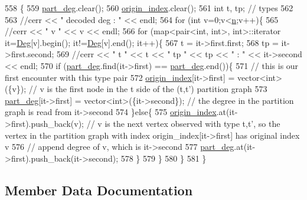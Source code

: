 \begin{DoxyCode}
558 \{
559   \hyperlink{classmarked__graph__decoder_a6882e96fcad9abb10e72f1398814824a}{part\_deg}.clear();
560   \hyperlink{classmarked__graph__decoder_aab3e2f6d4376ba96da32f25aa9ddd069}{origin\_index}.clear();
561   \textcolor{keywordtype}{int} t, tp; \textcolor{comment}{// types}
562 
563   \textcolor{comment}{//cerr << " decoded deg : " << endl;}
564   \textcolor{keywordflow}{for} (\textcolor{keywordtype}{int} v=0;v<\hyperlink{classmarked__graph__decoder_aefc93611bc4a3e9a5d3956d97649a0e9}{n};v++)\{
565     \textcolor{comment}{//cerr << " v " << v << endl;}
566     \textcolor{keywordflow}{for} (map<pair<int, int>, \textcolor{keywordtype}{int}>::iterator it=\hyperlink{classmarked__graph__decoder_a5040ad86467693eab415f615408bfb9e}{Deg}[v].begin(); it!=\hyperlink{classmarked__graph__decoder_a5040ad86467693eab415f615408bfb9e}{Deg}[v].end(); it++)\{
567       t = it->first.first;
568       tp = it->first.second;
569       \textcolor{comment}{//cerr << " t " << t << " tp " << tp << " : " << it->second << endl;}
570       \textcolor{keywordflow}{if} (\hyperlink{classmarked__graph__decoder_a6882e96fcad9abb10e72f1398814824a}{part\_deg}.find(it->first) == \hyperlink{classmarked__graph__decoder_a6882e96fcad9abb10e72f1398814824a}{part\_deg}.end())\{
571         \textcolor{comment}{// this is our first encounter with this type pair}
572         \hyperlink{classmarked__graph__decoder_aab3e2f6d4376ba96da32f25aa9ddd069}{origin\_index}[it->first] = vector<int>(\{v\}); \textcolor{comment}{// v is the first node in the t side of the
       (t,t') partition graph}
573         \hyperlink{classmarked__graph__decoder_a6882e96fcad9abb10e72f1398814824a}{part\_deg}[it->first] = vector<int>(\{it->second\}); \textcolor{comment}{// the degree in the partition graph is
       read from it->second}
574       \}\textcolor{keywordflow}{else}\{
575         \hyperlink{classmarked__graph__decoder_aab3e2f6d4376ba96da32f25aa9ddd069}{origin\_index}.at(it->first).push\_back(v); \textcolor{comment}{// v is the next vertex observed with type
       t,t', so the vertex in the partition graph with index origin\_index[it->first] has original index v }
576         \textcolor{comment}{// append degree of v, which is it->second}
577         \hyperlink{classmarked__graph__decoder_a6882e96fcad9abb10e72f1398814824a}{part\_deg}.at(it->first).push\_back(it->second);
578       \}
579     \}
580   \}
581 \}
\end{DoxyCode}


\subsection{Member Data Documentation}
\mbox{\label{classmarked__graph__decoder_a5040ad86467693eab415f615408bfb9e}} 
